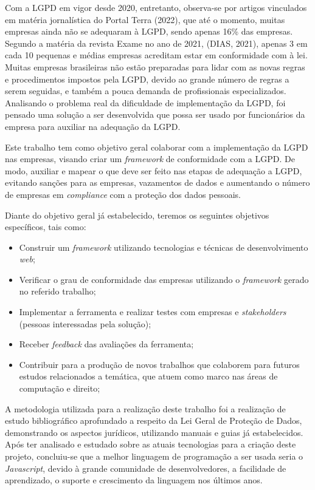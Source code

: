 \documentclass[
	12pt,				%
	openright,			%
	oneside,			%
	a4paper,			%
	english,			%
	french,				%
	spanish,			%
	brazil,				%
	]{abntex2}
\begin{document}
Com a LGPD em vigor desde 2020, entretanto, observa-se por artigos vinculados em matéria jornalística do Portal Terra (2022), que até o momento, muitas empresas ainda não se adequaram à LGPD, sendo apenas 16\% das empresas. Segundo a matéria da revista Exame no ano de 2021, (DIAS, 2021), apenas 3 em cada 10 pequenas e médias empresas acreditam estar em conformidade com à lei. Muitas empresas brasileiras não estão preparadas para lidar com as novas regras e procedimentos impostos pela LGPD, devido ao grande número de regras a serem seguidas, e também a pouca demanda de profissionais especializados. Analisando o problema real da dificuldade de implementação da LGPD, foi pensado uma solução a ser desenvolvida que possa ser usado por funcionários da empresa para auxiliar na adequação da LGPD.

Este trabalho tem como objetivo geral colaborar com a implementação da LGPD nas empresas, visando criar um \textit{framework} de conformidade com a LGPD. De modo, auxiliar e mapear o que deve ser feito nas etapas de adequação a LGPD, evitando sanções para as empresas, vazamentos de dados e aumentando o número de empresas em \textit{compliance} com a proteção dos dados pessoais.

Diante do objetivo geral já estabelecido, teremos os seguintes objetivos específicos, tais como:
\begin{itemize}
\item Construir um \textit{framework} utilizando tecnologias e técnicas de desenvolvimento \textit{web};
\item Verificar o grau de conformidade das empresas utilizando o \textit{framework} gerado no referido trabalho;
\item Implementar a ferramenta e realizar testes com empresas e \textit{stakeholders} (pessoas interessadas pela solução);
\item Receber \textit{feedback} das avaliações da ferramenta;
\item Contribuir para a produção de novos trabalhos que colaborem para futuros estudos relacionados a temática, que atuem como marco nas áreas de computação e direito;
\end{itemize}

A metodologia utilizada para a realização deste trabalho foi a realização de estudo bibliográfico aprofundado a respeito da Lei Geral de Proteção de Dados, demonstrando os aspectos jurídicos, utilizando manuais e guias já estabelecidos. Após ter analisado e estudado sobre as atuais tecnologias para a criação deste projeto, concluiu-se que a melhor linguagem de programação a ser usada seria o \textit{Javascript}, devido à grande comunidade de desenvolvedores, a facilidade de aprendizado, o suporte e crescimento da linguagem nos últimos anos.
\end{document}
